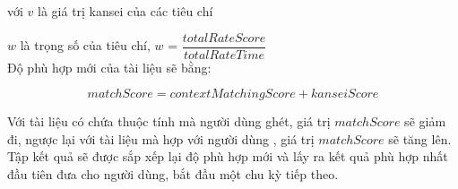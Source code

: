 với $v$ là giá trị kansei của các tiêu chí

$w$ là trọng số của tiêu chí, $w$ = $\dfrac{totalRateScore}{totalRateTime}$\\

Độ phù hợp mới của tài liệu sẽ bằng: 

\begin{equation}
matchScore = contextMatchingScore + kanseiScore
\end{equation}

Với tài liệu có chứa thuộc tính mà người dùng ghét, giá trị $matchScore$ sẽ giảm đi, ngược lại với tài liệu mà hợp với người dùng , giá trị $matchScore$ sẽ tăng lên. Tập kết quả sẽ được sắp xếp lại độ phù hợp mới và lấy ra kết quả phù hợp nhất đầu tiên đưa cho người dùng, bắt đầu một chu kỳ tiếp theo.